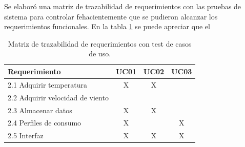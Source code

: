 Se elaboró una matriz de trazabilidad de requerimientos con las pruebas de sistema para controlar fehacientemente que se pudieron alcanzar los requerimientos funcionales.
En la tabla \ref{tab:trazabilidad_test} se puede apreciar que el 
\begin{table}[ht]
\centering
\caption{Matriz de trazabilidad de requerimientos con test de casos de uso.}
\label{tab:trazabilidad_test}
\begin{tabular}{lccc}
\toprule
\textbf{Requerimiento}					   & \textbf{UC01} 	  & \textbf{UC02}  & \textbf{UC03}  \\ \midrule
2.1 Adquirir temperatura                   & X                & X              &    		 	\\ %
2.2 Adquirir velocidad de viento           &                  &                &   		  		\\ %
2.3 Almacenar datos                        & X                & X              &      			\\ %
2.4 Perfiles de consumo                    & X                &                & X    			\\ %
2.5 Interfaz                               & X                & X              & X    			\\ 
\bottomrule
\end{tabular}
\end{table}